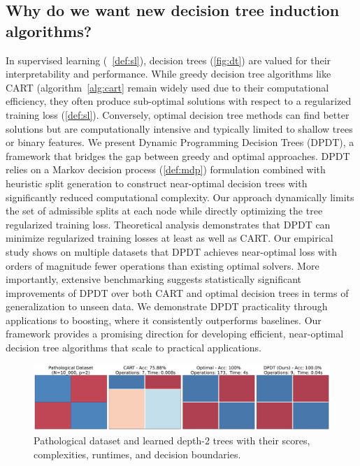 \subsection{Why do we want new decision tree induction algorithms?}
In supervised learning (~\ref{def:sl}), decision trees (\ref{fig:dt}) are valued for their interpretability and performance. 
While greedy decision tree algorithms like CART (algorithm~\ref{alg:cart} \cite{breiman1984classification}remain widely used due to their computational efficiency, they often produce sub-optimal solutions with respect to a regularized training loss (\ref{def:sl}). 
Conversely, optimal decision tree methods can find better solutions but are computationally intensive and typically limited to shallow trees or binary features. We present Dynamic Programming Decision Trees (DPDT), a framework that bridges the gap between greedy and optimal approaches. 
DPDT relies on a Markov decision process (\ref{def:mdp}) formulation combined with heuristic split generation to construct near-optimal decision trees with significantly reduced computational complexity. 
Our approach dynamically limits the set of admissible splits at each node while directly optimizing the tree regularized training loss. Theoretical analysis demonstrates that DPDT can minimize regularized training losses at least as well as CART\@. 
Our empirical study shows on multiple datasets that DPDT achieves near-optimal loss with orders of magnitude fewer operations than existing optimal solvers. 
More importantly, extensive benchmarking suggests statistically significant improvements of DPDT over both CART and optimal decision trees in terms of generalization to unseen data. We demonstrate DPDT practicality through applications to boosting, where it consistently outperforms baselines. 
Our framework provides a promising direction for developing efficient, near-optimal decision tree algorithms that scale to practical applications.

\begin{figure}
    \includegraphics[width=\textwidth]{images/figures/patho_bounds_comparison_checkers.pdf}
    \caption{Pathological dataset and learned depth-2 trees with their scores, complexities, runtimes, and decision boundaries.}
    \label{fig:patho}
\end{figure}

